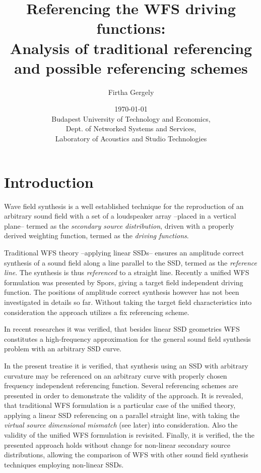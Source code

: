 \documentclass[12pt,a4paper]{article}
\title{Referencing the WFS driving functions:\\
Analysis of traditional referencing and possible referencing schemes}
\date{\today \\
Budapest University of Technology and Economics, \\ Dept. of Networked Systems and Services, \\ Laboratory of Acoustics and Studio Technologies}
\author{Firtha Gergely}
\begin{document}
\maketitle

\section{Introduction}

Wave field synthesis is a well established technique for the reproduction of an arbitrary sound field with a set of a loudspeaker array --placed in a vertical plane-- termed as the \emph{secondary source distribution}, driven with a properly derived weighting function, termed as the \emph{driving functions}. 

Traditional WFS theory --applying linear SSDs-- ensures an amplitude correct synthesis of a sound field along a line parallel to the SSD, termed as the \emph{reference line}. The synthesis is thus \emph{referenced} to a straight line. Recently a unified WFS formulation was presented by Spors, giving a target field independent driving function. The positions of amplitude correct synthesis however has not been investigated in details so far. Without taking the target field characteristics into consideration the approach utilizes a fix referencing scheme.

In recent researches it was verified, that besides linear SSD geometries WFS constitutes a high-frequency approximation for the general sound field synthesis problem with an arbitrary SSD curve.

In the present treatise it is verified, that synthesis using an SSD with arbitrary curvature may be referenced on an arbitrary curve with properly chosen frequency independent referencing function. Several referencing schemes are presented in order to demonstrate the validity of the approach. It is revealed, that traditional WFS formulation is a particular case of the unified theory, applying a linear SSD referencing on a parallel straight line, with taking the \emph{virtual source dimensional mismatch} (see later) into consideration.
Also the validity of the unified WFS formulation is revisited.
Finally, it is verified, the the presented approach holds without change for non-linear secondary source distributions, allowing the comparison of WFS with other sound field synthesis techniques employing non-linear SSDs.
\end{document}
